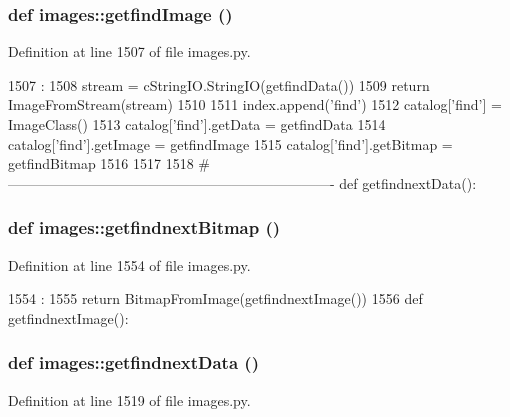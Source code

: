 \hypertarget{namespaceimages_a59d884454b5b132ffb57be4679d372e1}{
\subsubsection[{getfindImage}]{\setlength{\rightskip}{0pt plus 5cm}def images::getfindImage ()}}
\label{namespaceimages_a59d884454b5b132ffb57be4679d372e1}


Definition at line 1507 of file images.py.


\begin{DoxyCode}
1507                   :
1508     stream = cStringIO.StringIO(getfindData())
1509     return ImageFromStream(stream)
1510 
1511 index.append('find')
1512 catalog['find'] = ImageClass()
1513 catalog['find'].getData = getfindData
1514 catalog['find'].getImage = getfindImage
1515 catalog['find'].getBitmap = getfindBitmap
1516 
1517 
1518 #----------------------------------------------------------------------
def getfindnextData():
\end{DoxyCode}
\hypertarget{namespaceimages_a5afd28cc8f7e2cfb06296d5f2018e511}{
\subsubsection[{getfindnextBitmap}]{\setlength{\rightskip}{0pt plus 5cm}def images::getfindnextBitmap ()}}
\label{namespaceimages_a5afd28cc8f7e2cfb06296d5f2018e511}


Definition at line 1554 of file images.py.


\begin{DoxyCode}
1554                        :
1555     return BitmapFromImage(getfindnextImage())
1556 
def getfindnextImage():
\end{DoxyCode}
\hypertarget{namespaceimages_af9d92d0740834dd93d20d8a820fa7a5d}{
\subsubsection[{getfindnextData}]{\setlength{\rightskip}{0pt plus 5cm}def images::getfindnextData ()}}
\label{namespaceimages_af9d92d0740834dd93d20d8a820fa7a5d}


Definition at line 1519 of file images.py.


